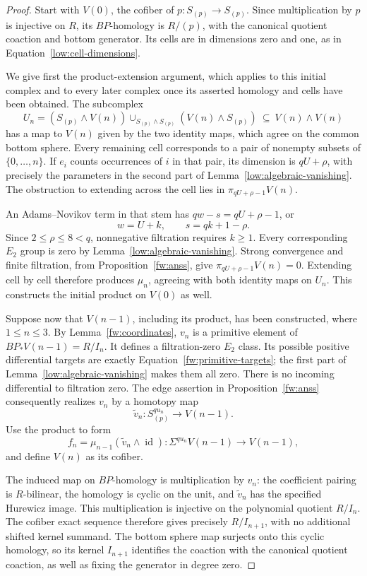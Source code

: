 \begin{proof}
Start with $V(0)$, the cofiber of $p:S_{(p)}\to S_{(p)}$.  Since
multiplication by $p$ is injective on $R$, its $BP$-homology is $R/(p)$,
with the canonical quotient coaction and bottom generator.  Its cells
are in dimensions zero and one, as in
Equation~\eqref{low:cell-dimensions}.

We give first the product-extension argument, which applies to this
initial complex and to every later complex once its asserted homology
and cells have been obtained.  The subcomplex
\[
 U_n=(S_{(p)}\wedge V(n))
       \mathop{\cup}_{S_{(p)}\wedge S_{(p)}}
       (V(n)\wedge S_{(p)})
       \ \subseteq\ V(n)\wedge V(n)
\]
has a map to $V(n)$ given by the two identity maps, which agree on the
common bottom sphere.  Every remaining cell corresponds to a pair of
nonempty subsets of $\{0,\ldots,n\}$.  If $e_i$ counts occurrences of $i$
in that pair, its dimension is $qU+\rho$, with precisely the parameters
in the second part of Lemma~\ref{low:algebraic-vanishing}.  The obstruction
to extending across the cell lies in
$\pi_{qU+\rho-1}V(n)$.

An Adams--Novikov term in that stem has
$qw-s=qU+\rho-1$, or
\[
 w=U+k,\qquad s=qk+1-\rho.
\]
Since $2\leq\rho\leq8<q$, nonnegative filtration requires $k\geq1$.
Every corresponding $E_2$ group is zero by
Lemma~\ref{low:algebraic-vanishing}.  Strong convergence and finite
filtration, from Proposition~\ref{fw:anss}, give
$\pi_{qU+\rho-1}V(n)=0$.  Extending cell by cell therefore produces
$\mu_n$, agreeing with both identity maps on $U_n$.  This constructs the
initial product on $V(0)$ as well.

Suppose now that $V(n-1)$, including its product, has been constructed,
where $1\leq n\leq3$.  By Lemma~\ref{fw:coordinates}, $v_n$ is a primitive
element of $BP_*V(n-1)=R/I_n$.  It defines a filtration-zero $E_2$ class.
Its possible positive differential targets are exactly
Equation~\eqref{fw:primitive-targets}; the first part of
Lemma~\ref{low:algebraic-vanishing} makes them all zero.  There is no
incoming differential to filtration zero.  The edge assertion in
Proposition~\ref{fw:anss} consequently realizes $v_n$ by a homotopy map
\[
 \widetilde v_n:S^{qu_n}_{(p)}\longrightarrow V(n-1).
\]
Use the product to form
\[
 f_n=\mu_{n-1}(\widetilde v_n\wedge\operatorname{id}):
       \Sigma^{qu_n}V(n-1)\longrightarrow V(n-1),
\]
and define $V(n)$ as its cofiber.

The induced map on $BP$-homology is multiplication by $v_n$: the
coefficient pairing is $R$-bilinear, the homology is cyclic on the unit,
and $\widetilde v_n$ has the specified Hurewicz image.  This multiplication is
injective on the polynomial quotient $R/I_n$.  The cofiber exact sequence
therefore gives precisely $R/I_{n+1}$, with no additional shifted kernel
summand.  The bottom sphere map surjects onto this cyclic homology, so its
kernel $I_{n+1}$ identifies the coaction with the canonical quotient
coaction, as well as fixing the generator in degree zero.


\end{proof}
